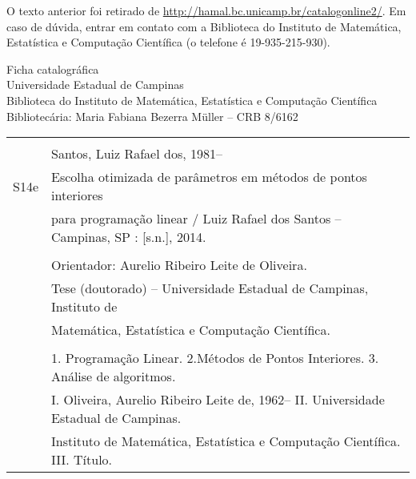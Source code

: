 O texto anterior foi retirado de
\url{http://hamal.bc.unicamp.br/catalogonline2/}. Em caso de dúvida, entrar em
contato com a Biblioteca do Instituto de Matemática, Estatística e Computação
Científica (o telefone é 19-935-215-930).

\thispagestyle{plain}  %


\newpage

\begin{titlepage}
\thispagestyle{plain}


\begin{center}
   Ficha catalográfica \\
   Universidade Estadual de Campinas \\
   Biblioteca do Instituto de Matemática, Estatística e Computação Científica\\
Bibliotec\'aria: Maria Fabiana Bezerra M\"uller -- CRB 8/6162 \\[1cm]
\end{center}

\begin{center}

\begin{tabular}{|cl|} \hline
  \hspace{1.3cm} & \\
  & Santos, Luiz Rafael dos, 1981--  \\
  \hspace{0.2cm} S14e & \hspace{0.6cm} Escolha otimizada de parâmetros em métodos de pontos interiores  \\ 
  &   para programação linear / Luiz Rafael dos Santos --
  Campinas, SP  : [s.n.], 2014. \\
  & \\
  & \hspace{0.6cm} Orientador: Aurelio Ribeiro Leite de Oliveira.\\
  & \hspace{0.6cm} Tese (doutorado) -- 
Universidade Estadual de Campinas, Instituto de  \\
  & Matem\'atica, Estat\'istica e Computa\c{c}\~ao   Cient\'ifica.\\ 
  & \\
  & \hspace{0.6cm} 1. Programação Linear. 2.Métodos de Pontos Interiores.  
  3. Análise de algoritmos.  \\ 
  & I. Oliveira, Aurelio Ribeiro Leite de, 1962--   \hspace{0.1cm} II. Universidade Estadual de
Campinas. 
  \\
  & Instituto de Matem\'atica,  Estat\'istica e Computa\c{c}\~ao Cient\'ifica.   III. T\'itulo. \\[0.5cm]
  \hline
\end{tabular}
\end{center}


\end{titlepage}
